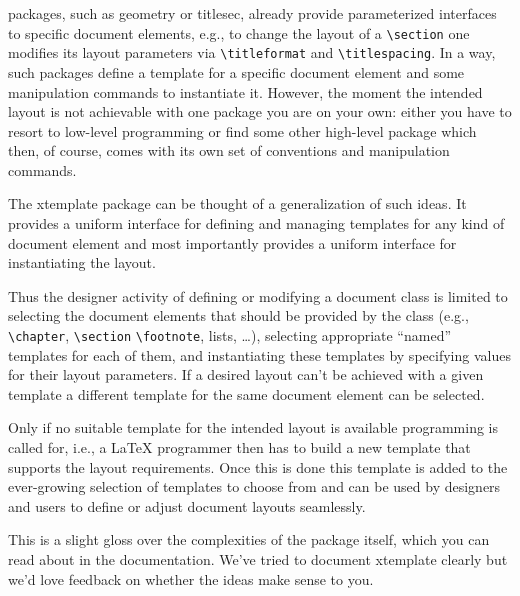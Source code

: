 \documentclass{ltnews}
\begin{document}
\LaTeXe{} packages, such as \textsf{geometry} or \textsf{titlesec}, already provide
parameterized interfaces to specific document elements, e.g., to change the
layout of a \verb|\section| one modifies its layout parameters via \verb|\titleformat| and \verb|\titlespacing|.
In a way, such packages define a template for a specific document element and
some manipulation commands to instantiate it. 
\pagebreak
However, the moment the intended
layout is not achievable with one package you are on your own: either you have
to resort to low-level programming or find some other high-level package which
then, of course, comes with its own set of conventions and manipulation commands.

The \textsf{xtemplate} package can be thought of a generalization of such
ideas. It provides a uniform interface for defining and managing templates for
any kind of document element and most importantly provides a uniform interface
for instantiating the layout.

Thus the designer activity of defining or modifying a document class is
limited to selecting the document elements that should be provided by the
class (e.g., \verb|\chapter|, \verb|\section| \verb|\footnote|, lists, \ldots), selecting
appropriate ``named'' templates for each of them, and instantiating these
templates by specifying values for their layout parameters. If a desired
layout can't be achieved with a given template a different template for the
same document element can be selected. 

Only if no suitable template for the intended layout is available programming
is called for, i.e., a \LaTeX{} programmer then has to build a new template
that supports the layout requirements. Once this is done this template is
added to the ever-growing selection of templates to choose from and can be
used by designers and users to define or adjust document layouts seamlessly.

This is a slight gloss over the complexities of the package itself, which you can read about in the documentation. We've tried to document \textsf{xtemplate} clearly but we'd love feedback on whether the ideas make sense to you.
\end{document}
